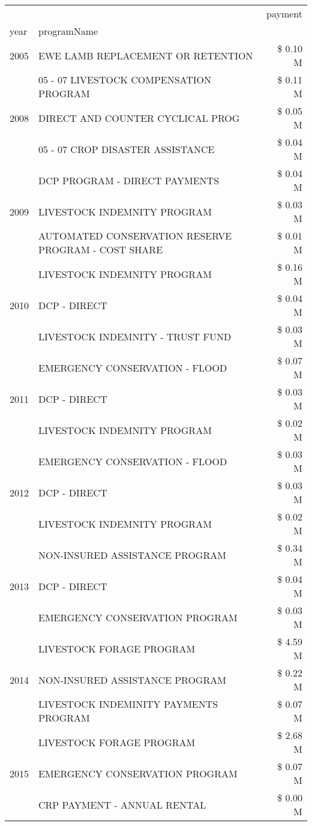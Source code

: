 \begin{tabular}{llr}
\toprule
 &  & payment \\
year & programName &  \\
\midrule
2005 & EWE LAMB REPLACEMENT OR RETENTION & \$ 0.10 M \\
\cline{1-3}
\multirow[t]{3}{*}{2008} & 05 - 07 LIVESTOCK COMPENSATION PROGRAM & \$ 0.11 M \\
 & DIRECT AND COUNTER CYCLICAL PROG & \$ 0.05 M \\
 & 05 - 07 CROP DISASTER ASSISTANCE & \$ 0.04 M \\
\cline{1-3}
\multirow[t]{3}{*}{2009} & DCP PROGRAM - DIRECT PAYMENTS & \$ 0.04 M \\
 & LIVESTOCK INDEMNITY PROGRAM & \$ 0.03 M \\
 & AUTOMATED CONSERVATION RESERVE PROGRAM - COST SHARE & \$ 0.01 M \\
\cline{1-3}
\multirow[t]{3}{*}{2010} & LIVESTOCK INDEMNITY PROGRAM & \$ 0.16 M \\
 & DCP - DIRECT & \$ 0.04 M \\
 & LIVESTOCK INDEMNITY - TRUST FUND & \$ 0.03 M \\
\cline{1-3}
\multirow[t]{3}{*}{2011} & EMERGENCY CONSERVATION - FLOOD & \$ 0.07 M \\
 & DCP - DIRECT & \$ 0.03 M \\
 & LIVESTOCK INDEMNITY PROGRAM & \$ 0.02 M \\
\cline{1-3}
\multirow[t]{3}{*}{2012} & EMERGENCY CONSERVATION - FLOOD & \$ 0.03 M \\
 & DCP - DIRECT & \$ 0.03 M \\
 & LIVESTOCK INDEMNITY PROGRAM & \$ 0.02 M \\
\cline{1-3}
\multirow[t]{3}{*}{2013} & NON-INSURED ASSISTANCE PROGRAM & \$ 0.34 M \\
 & DCP - DIRECT & \$ 0.04 M \\
 & EMERGENCY CONSERVATION PROGRAM & \$ 0.03 M \\
\cline{1-3}
\multirow[t]{3}{*}{2014} & LIVESTOCK FORAGE PROGRAM & \$ 4.59 M \\
 & NON-INSURED ASSISTANCE PROGRAM & \$ 0.22 M \\
 & LIVESTOCK INDEMINITY PAYMENTS PROGRAM & \$ 0.07 M \\
\cline{1-3}
\multirow[t]{3}{*}{2015} & LIVESTOCK FORAGE PROGRAM & \$ 2.68 M \\
 & EMERGENCY CONSERVATION PROGRAM & \$ 0.07 M \\
 & CRP PAYMENT - ANNUAL RENTAL & \$ 0.00 M \\

\end{tabular}
